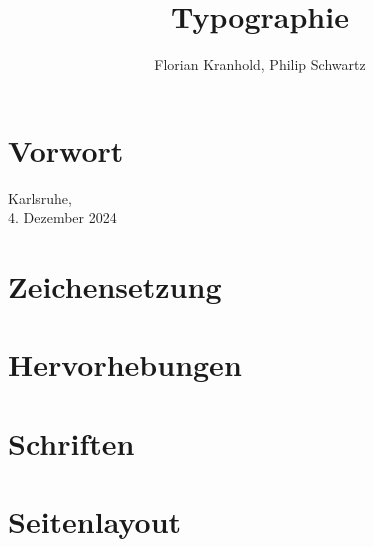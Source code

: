 \documentclass[ngerman]{scrbook}
\author{Florian Kranhold, Philip Schwartz}
\title {Typographie}
\begin{document}
\frontmatter


\chapter*{Vorwort}
\lipsum[1-2]

\begin{flushright}
  Karlsruhe,\\4. Dezember 2024
\end{flushright}

\mainmatter
\chapter{Zeichensetzung}


\chapter{Hervorhebungen}


\chapter{Schriften}


\chapter{Seitenlayout}

\end{document}
